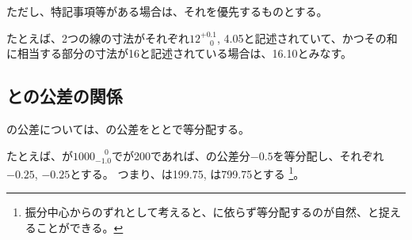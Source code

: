 ただし、特記事項等がある場合は、それを優先するものとする。
\begin{hosoku}
たとえば、2つの線の寸法がそれぞれ$12^{+0.1}_{\phantom -0}$, 4.05と記述されていて、かつその和に相当する部分の寸法が16と記述されている場合は、16.10とみなす。
\end{hosoku}



\clearpage


\subsection{\WorkTotalLength と\AlocationLength の公差の関係}
\AlocationLength の公差については、\WorkTotalLength の公差を\TopAlocationLength と\BottomAlocationLength とで等分配する。
\begin{hosoku}
たとえば、\WorkTotalLength が$1000^{\phantom +0}_{-1.0}$で\TopAlocationLength が200であれば、\WorkTotalLength の公差分$-0.5$を等分配し、それぞれ$-0.25$, $-0.25$とする。
つまり、\TopAlocationLength は199.75, \BottomAlocationLength は799.75とする
\footnote{振分中心からのずれとして考えると、\AlocationLength に依らず等分配するのが自然、と捉えることができる。}。
\end{hosoku}


